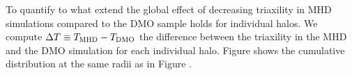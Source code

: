 \documentclass[a4paper,fleqn,usenatbib]{mnras}
\begin{document}
To quantify to what extend the global effect of decreasing
triaxility in MHD simulations compared to the DMO sample 
holds for individual halos. 
We compute $\Delta T\equiv T_{\rm MHD}-T_{\rm DMO}$ the difference between the
triaxility in the MHD and the DMO simulation for each individual halo. 
Figure \label{fig:delta_triaxial_cumulative} shows the cumulative
distribution at the same radii as in
Figure \label{fig:delta_triaxial_cumulative}. 
    






\end{document}
